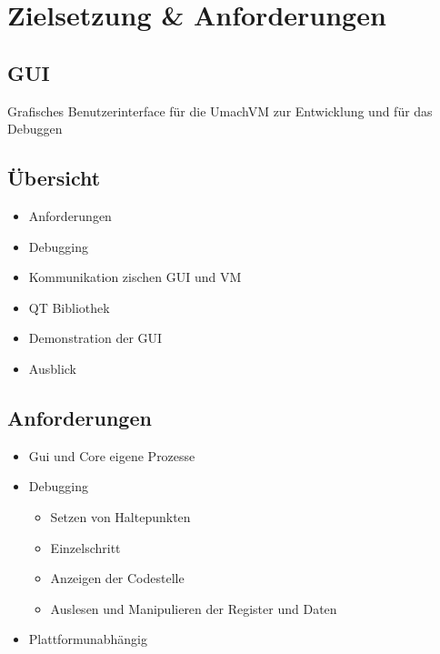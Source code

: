 \section{Zielsetzung \& Anforderungen}

\subsection{GUI}

\begin{frame}{\insertsubsection}
    Grafisches Benutzerinterface für die UmachVM
    zur Entwicklung und für das Debuggen
\end{frame}

\subsection{Übersicht}

\begin{frame}{\insertsubsection}
    \begin{itemize}
         \item Anforderungen
         \item Debugging
         \item Kommunikation zischen GUI und VM
         \item QT Bibliothek
         \item Demonstration der GUI
         \item Ausblick
    \end{itemize}
\end{frame}

\subsection{Anforderungen}

\begin{frame}{\insertsubsection}
    \begin{itemize}
         \item Gui und Core eigene Prozesse
         \item Debugging
	 \begin{itemize}
             \item Setzen von Haltepunkten
             \item Einzelschritt
             \item Anzeigen der Codestelle
             \item Auslesen und Manipulieren der Register und Daten
         \end{itemize}
         \item Plattformunabhängig
    \end{itemize}
\end{frame}

